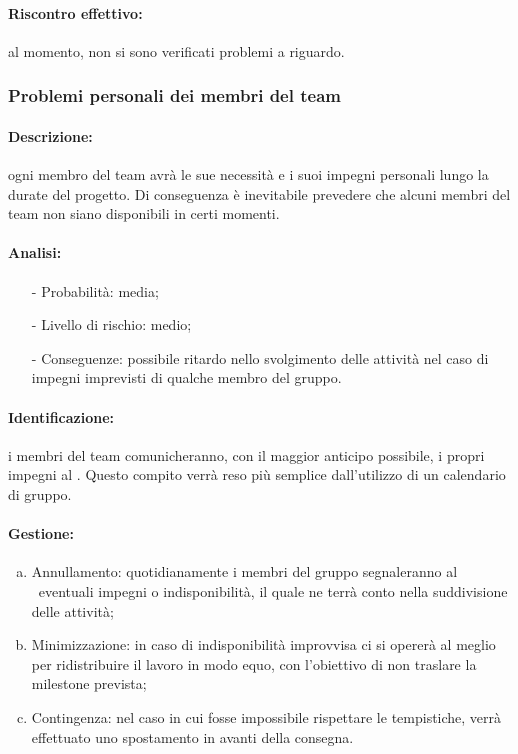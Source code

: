 \documentclass[../PianoProgetto.tex]{subfiles}
\begin{document}
	\paragraph*{Riscontro effettivo:} al momento, non si sono verificati problemi a riguardo.

\subsubsection{Problemi personali dei membri del team}

	\paragraph*{Descrizione:} ogni membro del team avrà le sue necessità e i suoi impegni personali lungo la durate del progetto. Di conseguenza è inevitabile prevedere che alcuni membri del team non siano disponibili in certi momenti.
	 
	\paragraph*{Analisi:}
	\begin{itemize}
		\item[-] Probabilità: media;
		\item[-] Livello di rischio: medio;
		\item[-] Conseguenze: possibile ritardo nello svolgimento delle attività nel caso di impegni imprevisti di qualche membro del gruppo.
	\end{itemize}	
		
	\paragraph*{Identificazione:} i membri del team comunicheranno, con il maggior anticipo possibile, i propri impegni al \responsabilediprogetto . Questo compito verrà reso più semplice dall'utilizzo di un calendario di gruppo. 
	
	\paragraph*{Gestione:}
	\begin{enumerate}[(a)]
		\item Annullamento: quotidianamente i membri del gruppo segnaleranno al \responsabilediprogetto\ eventuali impegni o indisponibilità, il quale ne terrà conto nella suddivisione delle attività;
		\item Minimizzazione: in caso di indisponibilità improvvisa ci si opererà al meglio per ridistribuire il lavoro in modo equo, con l'obiettivo di non traslare la milestone prevista;
		\item  Contingenza: nel caso in cui fosse impossibile rispettare le tempistiche, verrà effettuato uno spostamento in avanti della consegna.
	\end{enumerate}
			
\end{document}
